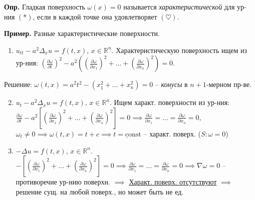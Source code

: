 \documentclass[12pt, a4paper]{article}
\begin{document}
\textbf{Опр.} Гладкая поверхность $\omega(x)=0$ называется \textit{характеристической} для ур-ния $(*)$, если в каждой точке она удовлетворяет $(\heartsuit)$.

\textbf{Пример.} Разные характеристические поверхности.
\begin{enumerate}
    \item $u_{tt} - a^2 \Delta_x u = f(t,x)$, $x \in \mathbb{R}^n$. Характеристическую поверхность ищем из ур-ния:
    $\left(\frac{\partial \omega}{\partial t}\right)^2 - a^2 \left( \left(\frac{\partial \omega}{\partial x_1}\right)^2 + \dots + \left(\frac{\partial \omega}{\partial x_n}\right)^2 \right) = 0$.
\end{enumerate}


Решение: $\omega(t,x) = a^2 t^2 - (x_1^2 + \dots + x_n^2) = 0$ -- \textit{конусы} в $n+1$-мерном пр-ве.

\begin{enumerate}\setcounter{enumi}{1}
    \item $u_t - a^2 \Delta_x u = f(t,x)$, $x \in \mathbb{R}^n$. Ищем характ. поверхности из ур-ния:
    $\frac{\partial \omega}{\partial t} - a^2 \left[ \left(\frac{\partial \omega}{\partial x_1}\right)^2 + \dots + \left(\frac{\partial \omega}{\partial x_n}\right)^2 \right] = 0 \implies \frac{\partial \omega}{\partial x_1} = \dots = \frac{\partial \omega}{\partial x_n} = 0$,
    $\omega_t \ne 0 \implies \omega(t,x) = t+c \implies \underline{t=\text{const}}$ -- характ. поверх. ($S: \omega=0$)

    \item $-\Delta u = f(t,x)$, $x \in \mathbb{R}^n$.
    $-\left[ \left(\frac{\partial \omega}{\partial x_1}\right)^2 + \dots + \left(\frac{\partial \omega}{\partial x_n}\right)^2 \right] = 0 \implies \frac{\partial \omega}{\partial x_1} = \dots = \frac{\partial \omega}{\partial x_n} = 0 \implies \nabla \omega = 0$ -- противоречие ур-нию поверхн.
    $\implies$ \underline{Характ. поверх. отсутствуют} $\implies$ решение сущ. на любой поверх., но может быть не ед.
\end{enumerate}
\end{document}
